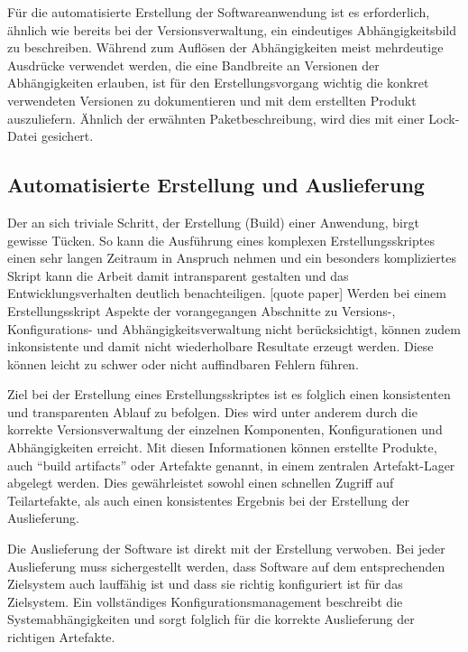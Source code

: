 Für die automatisierte Erstellung der Softwareanwendung ist es erforderlich, ähnlich wie bereits bei der Versionsverwaltung, ein eindeutiges Abhängigkeitsbild zu beschreiben. Während zum Auflösen der Abhängigkeiten meist mehrdeutige Ausdrücke verwendet werden, die eine Bandbreite an Versionen der Abhängigkeiten erlauben, ist für den Erstellungsvorgang wichtig die konkret verwendeten Versionen zu dokumentieren und mit dem erstellten Produkt auszuliefern. Ähnlich der erwähnten Paketbeschreibung, wird dies mit einer Lock-Datei gesichert.

\subsection{Automatisierte Erstellung und Auslieferung}

Der an sich triviale Schritt, der Erstellung (Build) einer Anwendung, birgt gewisse Tücken. So kann die Ausführung eines komplexen Erstellungsskriptes einen sehr langen Zeitraum in Anspruch nehmen und ein besonders kompliziertes Skript kann die Arbeit damit intransparent gestalten und das Entwicklungsverhalten deutlich benachteiligen. [quote paper] Werden bei einem Erstellungsskript Aspekte der vorangegangen Abschnitte zu Versions-, Konfigurations- und Abhängigkeitsverwaltung nicht berücksichtigt, können zudem inkonsistente und damit nicht wiederholbare Resultate erzeugt werden. Diese können leicht zu schwer oder nicht auffindbaren Fehlern führen.

Ziel bei der Erstellung eines Erstellungsskriptes ist es folglich einen konsistenten und transparenten Ablauf zu befolgen. Dies wird unter anderem durch die korrekte Versionsverwaltung der einzelnen Komponenten, Konfigurationen und Abhängigkeiten erreicht. Mit diesen Informationen können erstellte Produkte, auch ``build artifacts'' oder Artefakte genannt, in einem zentralen Artefakt-Lager abgelegt werden. Dies gewährleistet sowohl einen schnellen Zugriff auf Teilartefakte, als auch einen konsistentes Ergebnis bei der Erstellung der Auslieferung.

Die Auslieferung der Software ist direkt mit der Erstellung verwoben. Bei jeder Auslieferung muss sichergestellt werden, dass Software auf dem entsprechenden Zielsystem auch lauffähig ist und dass sie richtig konfiguriert ist für das Zielsystem. Ein vollständiges Konfigurationsmanagement beschreibt die Systemabhängigkeiten und sorgt folglich für die korrekte Auslieferung der richtigen Artefakte.


